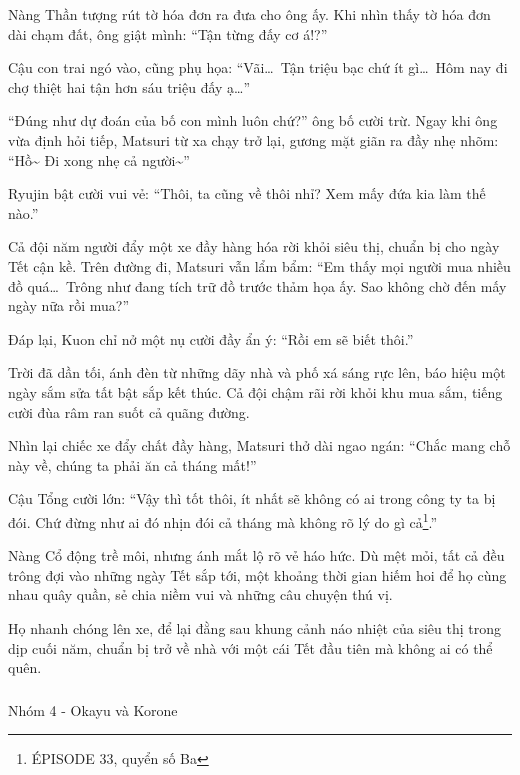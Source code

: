 \documentclass[../main.tex]{subfiles}
\begin{document}
Nàng Thần tượng rút tờ hóa đơn ra đưa cho ông ấy. Khi nhìn thấy tờ hóa đơn dài chạm đất, ông giật mình: ``Tận từng đấy cơ á!?''

Cậu con trai ngó vào, cũng phụ họa: ``Vãi\dots\ Tận triệu bạc chứ ít gì\dots\ Hôm nay đi chợ thiệt hai tận hơn sáu triệu đấy ạ\dots''

``Đúng như dự đoán của bố con mình luôn chứ?'' ông bố cười trừ. Ngay khi ông vừa định hỏi tiếp, Matsuri từ xa chạy trở lại, gương mặt giãn ra đầy nhẹ nhõm: ``Hồ\~{} Đi xong nhẹ cả người\~{}''

Ryujin bật cười vui vẻ: ``Thôi, ta cũng về thôi nhỉ? Xem mấy đứa kia làm thế nào.''

Cả đội năm người đẩy một xe đầy hàng hóa rời khỏi siêu thị, chuẩn bị cho ngày Tết cận kề. Trên đường đi, Matsuri vẫn lẩm bẩm: ``Em thấy mọi người mua nhiều đồ quá\dots\ Trông như đang tích trữ đồ trước thảm họa ấy. Sao không chờ đến mấy ngày nữa rồi mua?''

Đáp lại, Kuon chỉ nở một nụ cười đầy ẩn ý: ``Rồi em sẽ biết thôi.''

Trời đã dần tối, ánh đèn từ những dãy nhà và phố xá sáng rực lên, báo hiệu một ngày sắm sửa tất bật sắp kết thúc. Cả đội chậm rãi rời khỏi khu mua sắm, tiếng cười đùa râm ran suốt cả quãng đường.

Nhìn lại chiếc xe đẩy chất đầy hàng, Matsuri thở dài ngao ngán: ``Chắc mang chỗ này về, chúng ta phải ăn cả tháng mất!''

Cậu Tổng cười lớn: ``Vậy thì tốt thôi, ít nhất sẽ không có ai trong công ty ta bị đói. Chứ đừng như ai đó nhịn đói cả tháng mà không rõ lý do gì cả\footnote{{\flaregothic ÉPISODE 33}, quyển số Ba}.''

Nàng Cổ động trề môi, nhưng ánh mắt lộ rõ vẻ háo hức. Dù mệt mỏi, tất cả đều trông đợi vào những ngày Tết sắp tới, một khoảng thời gian hiếm hoi để họ cùng nhau quây quần, sẻ chia niềm vui và những câu chuyện thú vị.

Họ nhanh chóng lên xe, để lại đằng sau khung cảnh náo nhiệt của siêu thị trong dịp cuối năm, chuẩn bị trở về nhà với một cái Tết đầu tiên mà không ai có thể quên.

\vspace{-40pt} \subsubsection*{\label{ep-003.IVd}} 

\begin{center}
    {\color{T4} Nhóm 4 - Okayu và Korone}
\end{center}
\end{document}
